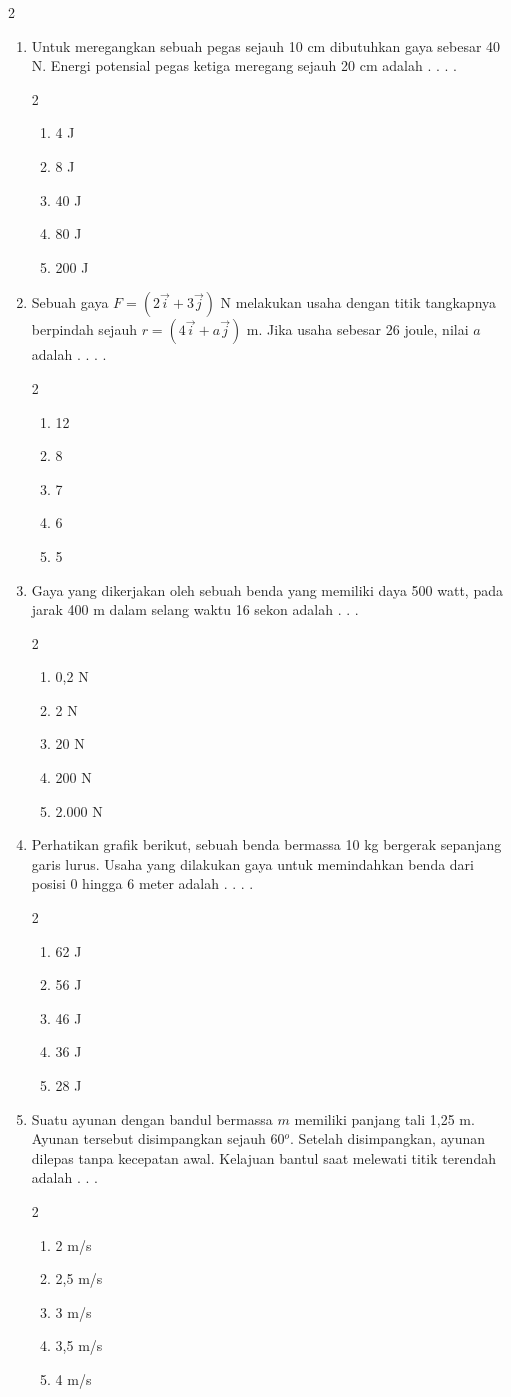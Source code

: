 \documentclass[10pt,a4paper]{article}
\newcommand{\pilgani}[1]{                            \vspace{-0.3cm}\begin{multicols}{2}
 \begin{enumerate}[label=\Alph*., itemsep=0pt,topsep=0pt,leftmargin=*,align=Center]#1                     \end{enumerate}
 \phantom{ini cuma sapi, wedus, dan ayam}
 \end{multicols}}
\begin{document}
\begin{multicols*} {2}
\begin{enumerate}
    \item Untuk meregangkan sebuah pegas sejauh 10 cm dibutuhkan gaya sebesar 40 N. Energi potensial pegas ketiga meregang sejauh 20 cm adalah . . . .
    \pilgani{
    \item 4 J
    \item 8 J
    \item 40 J
    \item 80 J
    \item 200 J
    } \vspace{3cm}
    
    
    \item Sebuah gaya $F=(2\vec{i}+3\vec{j})$ N melakukan usaha dengan titik tangkapnya berpindah sejauh $r=(4\vec{i}+a\vec{j})$ m. Jika usaha sebesar 26 joule, nilai $a$ adalah . . . .
  \pilgani{  \item 12 
    \item 8
    \item 7
    \item 6 
    \item 5 } \vspace{3cm}
    
    
    \item Gaya yang dikerjakan oleh sebuah benda yang memiliki daya 500 watt, pada jarak 400 m dalam selang waktu 16 sekon adalah . . . 
    \pilgani{
    \item 0,2 N
    \item 2 N
    \item 20 N
    \item 200 N
    \item 2.000 N
    }\vspace{3cm}
    
    \item Perhatikan grafik berikut, sebuah benda bermassa 10 kg bergerak sepanjang garis lurus. 
    \vspace{2cm}
    Usaha yang dilakukan gaya untuk memindahkan benda dari posisi 0 hingga 6 meter adalah . . . .
    \pilgani{
    \item 62 J
    \item 56 J
    \item 46 J
    \item 36 J
    \item 28 J
    }
    \vspace{3cm}
    
    \item Suatu ayunan dengan bandul bermassa $m$ memiliki panjang tali 1,25 m. Ayunan tersebut disimpangkan sejauh 60$^o$. Setelah disimpangkan, ayunan dilepas tanpa kecepatan awal. Kelajuan bantul saat melewati titik terendah adalah . . . 
    \pilgani{
    \item 2 m/s
    \item 2,5 m/s
    \item 3 m/s
    \item 3,5 m/s
    \item 4 m/s
    }
    \vspace{3cm}
    

\end{enumerate}
\end{multicols*}
\end{document}

